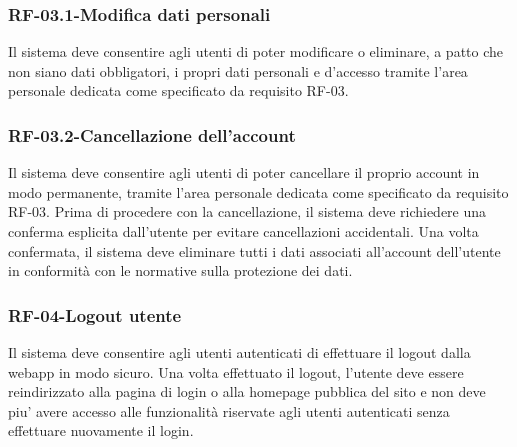 \subsubsection*{RF-03.1-Modifica dati personali}
Il sistema deve consentire agli utenti di poter modificare o eliminare, a patto che non siano dati obbligatori, i propri dati personali e d'accesso tramite l'area personale dedicata come specificato da requisito RF-03.
\subsubsection*{RF-03.2-Cancellazione dell'account}
Il sistema deve consentire agli utenti di poter cancellare il proprio account in modo permanente, tramite l'area personale dedicata come specificato da requisito RF-03. Prima di procedere con la cancellazione, il sistema deve richiedere una conferma esplicita dall'utente per evitare cancellazioni accidentali. Una volta confermata, il sistema deve eliminare tutti i dati associati all'account dell'utente in conformità con le normative sulla protezione dei dati.
\subsubsection*{RF-04-Logout utente}
Il sistema deve consentire agli utenti autenticati di effettuare il logout dalla webapp in modo sicuro. Una volta effettuato il logout, l'utente deve essere reindirizzato alla pagina di login o alla homepage pubblica del sito e non deve piu' avere accesso alle funzionalità riservate agli utenti autenticati senza effettuare nuovamente il login.
